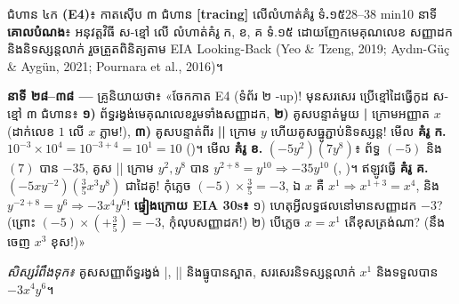 \documentclass[a4paper,12pt]{article}
\newcommand{\en}[1]{{\TimesEn #1}}
\newcommand{\enbf}[1]{{\TimesEn\textbf{#1}}}
\newcommand{\cnum}[1]{{\TimesEn\fontsize{10.5pt}{12pt}\selectfont\ding{\numexpr181+#1\relax}}}
\newcommand{\scriptlead}{{\normalfont\mdseries\muol\fontsize{10.8pt}{17pt}\selectfont គ្រូនិយាយថា៖}}
\begin{document}
\Needspace{2.0cm}
\begin{phasebox}{ជំហាន ៤ក \enbf{(E4)}៖ កាតស៊ើប ៣ ជំហាន \enbf{[tracing]} លើលំហាត់គំរូ ទំ\enbf{.}១៥}{28--38 min}{10 នាទី}
\textbf{គោលបំណង}៖ អនុវត្តវិធី \en{[tracing]} ស-ខ្មៅ លើ លំហាត់គំរូ ក, ខ, គ ទំ.១៥ ដោយញែកមេគុណលេខ សញ្ញាដក និងនិទស្សន្តលាក់ \en{1} រួចត្រួតពិនិត្យតាម \en{EIA Looking-Back} \en{(Yeo \& Tzeng, 2019; Aydın-Güç \& Aygün, 2021; Pournara et al., 2016)}។
\end{phasebox}
\begin{scriptbox}
  \textbf{នាទី ២៨--៣៨ —} \scriptlead{} «ចែកកាត \en{E4} (ទំព័រ ២ \en{2-up})! មុនសរសេរ ប្រើខ្មៅដៃធ្វើកូដ ស-ខ្មៅ \textbf{\en{[tracing]}} ៣ ជំហាន៖ \textbf{១)} ព័ទ្ធរង្វង់មេគុណលេខរួមទាំងសញ្ញាដក, \textbf{២)} គូសបន្ទាត់មួយ \en{\textbf{|}} ក្រោមអញ្ញាត $x$ (ដាក់លេខ $1$ លើ $x$ ភ្លាម!), \textbf{៣)} គូសបន្ទាត់ពីរ \en{\textbf{||}} ក្រោម $y$ ហើយគូសធ្នូភ្ជាប់និទស្សន្ត! មើល \textbf{គំរូ ក.} $10^{-3}\times 10^4 = 10^{-3+4} = 10^1 = 10$ (\cnum{2})។ មើល \textbf{គំរូ ខ.} $(-5y^2)(7y^8)$៖ ព័ទ្ធ $(-5)$ និង $(7)$ បាន $-35$, គូស \en{||} ក្រោម $y^2, y^8$ បាន $y^{2+8}=y^{10} \Rightarrow -35y^{10}$ (\cnum{4}, \cnum{2})។ ឥឡូវធ្វើ \textbf{គំរូ គ.} $(-5xy^{-2})(\frac{3}{5}x^3y^8)$ ជាដៃគូ! កុំភ្លេច $(-5)\times\frac{3}{5}=-3$, ឯ $x$ គឺ $x^1 \Rightarrow x^{1+3}=x^4$, និង $y^{-2+8}=y^6 \Rightarrow -3x^4y^6$! \textbf{ផ្ទៀងក្រោយ \en{EIA 30s}៖} ១) ហេតុអ្វីលទ្ធផលនៅមានសញ្ញាដក $-3$? (ព្រោះ $(-5)\times(+\frac{3}{5})=-3$, កុំលុបសញ្ញាដក!) ២) បើភ្លេច $x=x^1$ តើខុសត្រង់ណា? (នឹងចេញ $x^3$ ខុស!)»\par
  \textit{សិស្សរំពឹងទុក៖} គូសសញ្ញាព័ទ្ធរង្វង់ \en{|}, \en{||} និងធ្នូបានស្អាត, សរសេរនិទស្សន្តលាក់ $x^1$ និងទទួលបាន $-3x^4y^6$។
\end{scriptbox}
\end{document}
